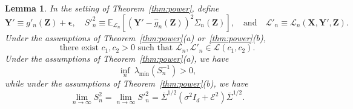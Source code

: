 \documentclass[12pt]{article}
\newtheorem{lemma}{Lemma}
\theoremstyle{definition}
\theoremstyle{remark}
\newcommand{\prx}{\bm X}
\newcommand{\prz}{\bm Z}
\newcommand{\pry}{{\bm Y}}
\newcommand{\peps}{\bm \epsilon}
\begin{document}
\begin{lemma} \label{lem:fourth-moment}
	In the setting of Theorem~\ref{thm:power}, define
	\begin{equation}
		\pry' \equiv g'_n(\prz) + \peps, \quad S'^2_{n} \equiv \mathbb E_{\mathcal L_n}[(\pry' - \widehat g_n(\prz))^2 \Sigma_n(\prz)], \quad \text{and} \quad \mathcal L'_n \equiv \mathcal L_n(\prx, \pry', \prz).
		\label{prime-definitions}
	\end{equation}
	Under the assumptions of Theorem~\ref{thm:power}(a) or~\ref{thm:power}(b), 
	\begin{equation}
		\text{there exist } c_1, c_2 > 0 \text{ such that } \mathcal L_n, \mathcal L'_n \in \mathscr L(c_1, c_2).
		\label{eighth-moment}
	\end{equation} 
	Under the assumptions of Theorem~\ref{thm:power}(a), we have
	\begin{equation}
	\inf_{n}\ \lambda_{\min}(S_n^{-1}) > 0,
	\label{eq:s-n-2-limit-a}
	\end{equation}
while under the assumptions of Theorem~\ref{thm:power}(b), we have
	\begin{equation}
		\lim_{n \rightarrow \infty} S_n^2 = \lim_{n \rightarrow \infty}  S'^2_n = \overline \Sigma^{1/2}(\sigma^2 I_d + \mathcal E^2)\overline \Sigma^{1/2}.
		\label{eq:s-n-2-limit}
	\end{equation}
	
\end{lemma}
\end{document}
